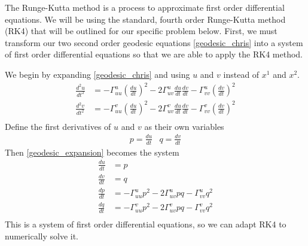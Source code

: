 \documentclass[12pt]{article}
\begin{document}
		The Runge-Kutta method is a process to approximate first order differential equations.
		We will be using the standard, fourth order Runge-Kutta method (RK4) that will be outlined for our specific problem below.
		First, we must transform our two second order geodesic equations \ref{geodesic_chris} into a system of first order differential equations so that we are able to apply the RK4 method.
		
		We begin by expanding \ref{geodesic_chris} and using $u$ and $v$ instead of $x^1$ and $x^2$.
		\begin{equation} \label{geodesic_expansion} \begin{split} 
			\frac{d^2u}{dt^2} & = -\Gamma^u_{uu}\left(\frac{du}{dt}\right)^2-2\Gamma^u_{uv}\frac{du}{dt}\frac{dv}{dt}-\Gamma^u_{vv}\left(\frac{dv}{dt}\right)^2 \\
			\frac{d^2v}{dt^2} & = -\Gamma^v_{uu}\left(\frac{du}{dt}\right)^2-2\Gamma^v_{uv}\frac{du}{dt}\frac{dv}{dt}-\Gamma^v_{vv}\left(\frac{dv}{dt}\right)^2 \\
		\end{split} \end{equation}
		Define the first derivatives of $u$ and $v$ as their own variables
		\begin{equation*} \begin{array}{cc}
			p = \frac{du}{dt} & q = \frac{dv}{dt}
		\end{array} \end{equation*}
		Then \ref{geodesic_expansion} becomes the system
		\begin{equation} \begin{split}
			\frac{du}{dt} & = p \\
			\frac{dv}{dt} & = q \\
			\frac{dp}{dt} & = -\Gamma^u_{uu}p^2-2\Gamma^u_{uv}pq-\Gamma^u_{vv}q^2 \\
			\frac{dq}{dt} & = -\Gamma^v_{uu}p^2-2\Gamma^v_{uv}pq-\Gamma^v_{vv}q^2 \\
		\end{split} \end{equation}
		This is a system of first order differential equations, so we can adapt RK4 to numerically solve it.
		
\end{document}
